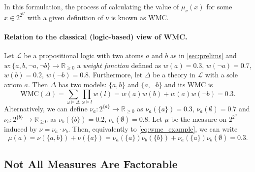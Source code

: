\documentclass{article}
\theoremstyle{definition}
\theoremstyle{remark}
\begin{document}
{In this formulation, the process of calculating the value of $\mu_\nu(x)$ for
some $x \in 2^{2^U}$ with a given definition of $\nu$ is known as WMC.

\paragraph{Relation to the classical (logic-based) view of WMC.} Let
$\mathcal{L}$ be a propositional logic with two atoms $a$ and $b$ as in
\cref{sec:prelims} and $w\colon \{ a, b, \neg a, \neg b \} \to \mathbb{R}_{\ge
  0}$ a \emph{weight function} defined as $w(a) = 0.3$, $w(\neg a) = 0.7$, $w(b)
= 0.2$, $w(\neg b) = 0.8$. Furthermore, let $\Delta$ be a theory in
$\mathcal{L}$ with a sole axiom $a$. Then $\Delta$ has two models: $\{ a, b \}$
and $\{ a, \neg b \}$ and its WMC \cite{DBLP:journals/ai/ChaviraD08} is
\begin{equation} \label{eq:wmc_example}
  \mathrm{WMC}(\Delta) = \sum_{\omega \models \Delta} \prod_{\omega \models l} w(l) = w(a)w(b) + w(a)w(\neg b) = 0.3.
\end{equation}
Alternatively, we can define $\nu_a\colon 2^{\{a\}} \to \mathbb{R}_{\ge 0}$ as
$\nu_a(\{ a \}) = 0.3$, $\nu_a(\emptyset) = 0.7$ and $\nu_b\colon 2^{\{b\}} \to
\mathbb{R}_{\ge 0}$ as $\nu_b(\{ b \}) = 0.2$, $\nu_b(\emptyset) = 0.8$. Let
$\mu$ be the measure on $2^{2^U}$ induced by $\nu = \nu_a \cdot \nu_b$. Then,
equivalently to \cref{eq:wmc_example}, we can write
\[
  \mu(a) = \nu(\{ a, b \}) + \nu(\{ a \}) = \nu_a(\{a\})\nu_b(\{b\}) +
  \nu_a(\{a\})\nu_b(\emptyset) = 0.3.
\]

\subsection{Not All Measures Are Factorable}


}
\end{document}
